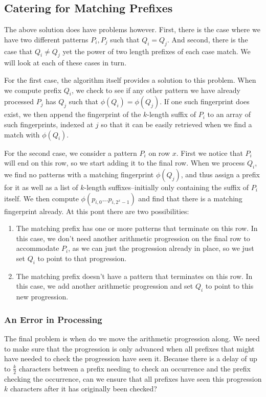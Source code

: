 \documentclass[ %
                    author={Dominic Joseph Moylett},
                    degree={MEng},
                     title={Dictionary Matching with Fingerprints},
                  subtitle={An Empirical Analysis},
                      type={Research},
                      year={2014} ]{dissertation}
\begin{document}
\subsection{Catering for Matching Prefixes}

The above solution does have problems however. First, there is the case where we have two different patterns $P_i, P_j$ such that $Q_i = Q_j$. And second, there is the case that $Q_i \neq Q_j$ yet the power of two length prefixes of each case match. We will look at each of these cases in turn.

For the first case, the algorithm itself provides a solution to this problem. When we compute prefix $Q_i$, we check to see if any other pattern we have already processed $P_j$ has $Q_j$ such that $\phi(Q_i) = \phi(Q_j)$. If one such fingerprint does exist, we then append the fingerprint of the $k$-length suffix of $P_i$ to an array of such fingerprints, indexed at $j$ so that it can be easily retrieved when we find a match with $\phi(Q_i)$.

For the second case, we consider a pattern $P_i$ on row $x$. First we notice that $P_i$ will end on this row, so we start adding it to the final row. When we process $Q_i$, we find no patterns with a matching fingerprint $\phi(Q_j)$, and thus assign a prefix for it as well as a list of $k$-length suffixes--initially only containing the suffix of $P_i$ itself. We then compute $\phi(p_{i,0}...p_{i,2^x-1})$ and find that there is a matching fingerprint already. At this pont there are two possibilities:

\begin{enumerate}
  \item The matching prefix has one or more patterns that terminate on this row. In this case, we don't need another arithmetic progression on the final row to accommodate $P_i$, as we can just the progression already in place, so we just set $Q_i$ to point to that progression.
  \item The matching prefix doesn't have a pattern that terminates on this row. In this case, we add another arithmetic progression and set $Q_i$ to point to this new progression.
\end{enumerate}

\subsubsection{An Error in Processing}

The final problem is when do we move the arithmetic progression along. We need to make sure that the progression is only advanced when all prefixes that might have needed to check the progression have seen it. Because there is a delay of up to $\frac{k}{2}$ characters between a prefix needing to check an occurrence and the prefix checking the occurrence, can we ensure that all prefixes have seen this progression $k$ characters after it has originally been checked?
\end{document}
